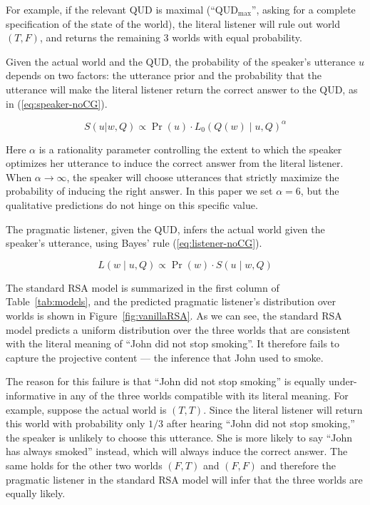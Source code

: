 For example, if the relevant QUD is maximal (``QUD$_\textrm{max}$'', asking for a complete specification of the state of the world), the literal listener will rule out world
 $(T, F)$, and returns the remaining 3 worlds with equal probability.


Given the actual world and the QUD, the probability of 
 the speaker's utterance $u$ depends on two factors: the utterance prior 
 and the probability that the utterance will make the literal listener 
 return the correct answer to the QUD, as in (\ref{eq:speaker-noCG}).
 
\begin{equation}
S(u | w, Q) \propto \Pr(u) \cdot L_0(Q(w) \mid u, Q)^\alpha 
\label{eq:speaker-noCG}
\end{equation}

Here $\alpha$ is a rationality parameter controlling the extent to which 
 the speaker optimizes her utterance to induce the correct answer from the 
 literal listener. 
When $\alpha \rightarrow \infty$, the speaker will choose utterances that 
 strictly maximize the probability of inducing the right answer.
In this paper we set $\alpha=6$, but the qualitative predictions do not hinge on 
 this specific value.

The pragmatic listener, given the QUD, infers the actual world given the speaker's utterance, using Bayes' rule (\ref{eq:listener-noCG}).

\begin{equation}
L(w \mid u, Q) \propto \Pr(w) \cdot S(u \mid w, Q) \label{eq:listener-noCG}
\end{equation}

The standard RSA model is summarized in the first column of Table~\ref{tab:models},
 and the predicted pragmatic listener's distribution over worlds is shown in Figure~\ref{fig:vanillaRSA}.
As we can see, the standard RSA model predicts a uniform distribution over the
 three worlds that are consistent with the literal meaning of 
 ``John did not stop smoking''. It therefore fails to capture the projective content --- the inference that  
 John used to smoke.

The reason for this failure is that ``John did not stop smoking'' is equally
 under-informative in any of the three worlds compatible with its literal meaning.
For example, suppose the actual world is $(T, T)$. Since the 
 literal listener will return this world with probability only $1/3$ after hearing ``John did not stop smoking,'' the speaker is unlikely to choose this utterance.
She is more likely to say ``John has always smoked'' instead, which will always
 induce the correct answer. 
The same holds for the other two worlds $(F, T)$ and $(F,
 F)$ and therefore the pragmatic listener in the standard RSA model will 
 infer that the three worlds are equally likely.
 
